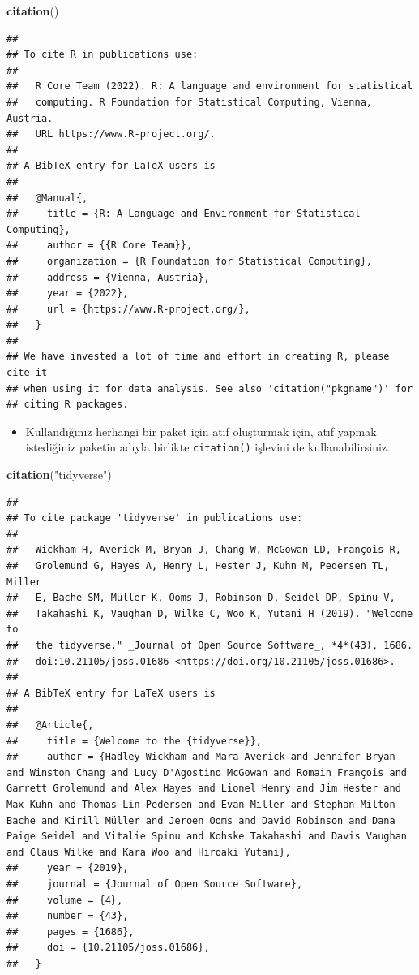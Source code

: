\documentclass[
  oneside]{book}
\newenvironment{Shaded}{\begin{snugshade}}{\end{snugshade}}
\newcommand{\FunctionTok}[1]{\textcolor[rgb]{0.13,0.29,0.53}{\textbf{#1}}}
\newcommand{\NormalTok}[1]{#1}
\newcommand{\StringTok}[1]{\textcolor[rgb]{0.31,0.60,0.02}{#1}}
\providecommand{\tightlist}{%
  \setlength{\itemsep}{0pt}\setlength{\parskip}{0pt}}
\begin{document}
\begin{Shaded}
\begin{Highlighting}[]
\FunctionTok{citation}\NormalTok{()}
\end{Highlighting}
\end{Shaded}

\begin{verbatim}
## 
## To cite R in publications use:
## 
##   R Core Team (2022). R: A language and environment for statistical
##   computing. R Foundation for Statistical Computing, Vienna, Austria.
##   URL https://www.R-project.org/.
## 
## A BibTeX entry for LaTeX users is
## 
##   @Manual{,
##     title = {R: A Language and Environment for Statistical Computing},
##     author = {{R Core Team}},
##     organization = {R Foundation for Statistical Computing},
##     address = {Vienna, Austria},
##     year = {2022},
##     url = {https://www.R-project.org/},
##   }
## 
## We have invested a lot of time and effort in creating R, please cite it
## when using it for data analysis. See also 'citation("pkgname")' for
## citing R packages.
\end{verbatim}

\begin{itemize}
\tightlist
\item
  Kullandığınız herhangi bir paket için atıf oluşturmak için, atıf yapmak istediğiniz paketin adıyla birlikte \texttt{citation()} işlevini de kullanabilirsiniz.
\end{itemize}

\begin{Shaded}
\begin{Highlighting}[]
\FunctionTok{citation}\NormalTok{(}\StringTok{"tidyverse"}\NormalTok{)}
\end{Highlighting}
\end{Shaded}

\begin{verbatim}
## 
## To cite package 'tidyverse' in publications use:
## 
##   Wickham H, Averick M, Bryan J, Chang W, McGowan LD, François R,
##   Grolemund G, Hayes A, Henry L, Hester J, Kuhn M, Pedersen TL, Miller
##   E, Bache SM, Müller K, Ooms J, Robinson D, Seidel DP, Spinu V,
##   Takahashi K, Vaughan D, Wilke C, Woo K, Yutani H (2019). "Welcome to
##   the tidyverse." _Journal of Open Source Software_, *4*(43), 1686.
##   doi:10.21105/joss.01686 <https://doi.org/10.21105/joss.01686>.
## 
## A BibTeX entry for LaTeX users is
## 
##   @Article{,
##     title = {Welcome to the {tidyverse}},
##     author = {Hadley Wickham and Mara Averick and Jennifer Bryan and Winston Chang and Lucy D'Agostino McGowan and Romain François and Garrett Grolemund and Alex Hayes and Lionel Henry and Jim Hester and Max Kuhn and Thomas Lin Pedersen and Evan Miller and Stephan Milton Bache and Kirill Müller and Jeroen Ooms and David Robinson and Dana Paige Seidel and Vitalie Spinu and Kohske Takahashi and Davis Vaughan and Claus Wilke and Kara Woo and Hiroaki Yutani},
##     year = {2019},
##     journal = {Journal of Open Source Software},
##     volume = {4},
##     number = {43},
##     pages = {1686},
##     doi = {10.21105/joss.01686},
##   }
\end{verbatim}
\end{document}
